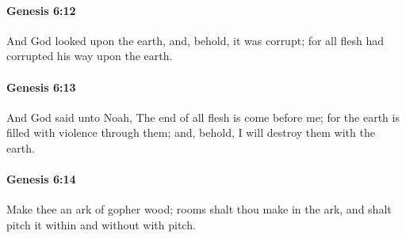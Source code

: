 		\paragraph{Genesis 6:12} %
			\label{GENESIS-6-12}

			And God looked upon the earth, and, behold, it was corrupt; for all flesh had corrupted his way upon the earth.


		\paragraph{Genesis 6:13} %
			\label{GENESIS-6-13}

			And God said unto Noah, The end of all flesh is come before me; for the earth is filled with violence through them; and, behold, I will destroy them with the earth.


		\paragraph{Genesis 6:14} %
			\label{GENESIS-6-14}

			Make thee an ark of gopher wood; rooms shalt thou make in the ark, and shalt pitch it within and without with pitch.



